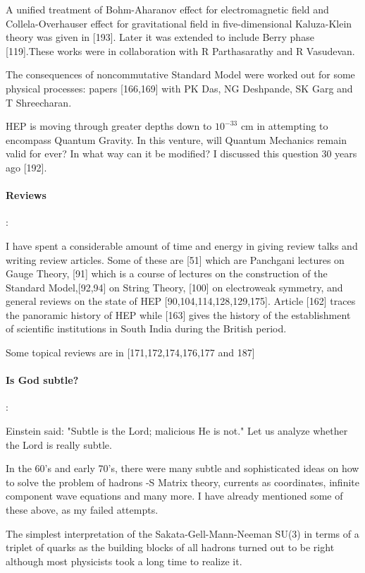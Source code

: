A unified treatment of Bohm-Aharanov effect for electromagnetic field 
and Collela-Overhauser effect for gravitational field in 
five-dimensional Kaluza-Klein theory was given in [193]. Later it was 
extended to include Berry phase [119].These works were in collaboration 
with R Parthasarathy and R Vasudevan.

The consequences of noncommutative Standard Model were worked out for 
some physical processes: papers [166,169] with PK Das, NG Deshpande, SK 
Garg and T Shreecharan.

HEP is moving through greater depths down to $10^{-33}$ cm in attempting 
to encompass Quantum Gravity. In this venture, will Quantum Mechanics 
remain valid for ever? In what way can it be modified? I discussed this 
question 30 years ago [192].

\paragraph{Reviews}:

I have spent a considerable amount of time and energy in giving review 
talks and writing review articles. Some of these are [51] which are 
Panchgani lectures on Gauge Theory, [91] which is a course of lectures 
on the construction of the Standard Model,[92,94] on String Theory, 
[100] on electroweak symmetry, and general reviews on the state of HEP 
[90,104,114,128,129,175]. Article [162] traces the panoramic history of 
HEP while [163] gives the history of the establishment of scientific 
institutions in South India during the British period.

Some topical reviews are in [171,172,174,176,177 and 187]

\paragraph{Is God subtle?}:

Einstein said: "Subtle is the Lord; malicious He is not." Let us analyze 
whether the Lord is really subtle.

In the 60's and early 70's, there were many subtle and sophisticated 
ideas on how to solve the problem of hadrons -S Matrix theory, currents 
as coordinates, infinite component wave equations and many more. I have 
already mentioned some of these above, as my failed attempts.

The simplest interpretation of the Sakata-Gell-Mann-Neeman SU(3) in 
terms of a triplet of quarks as the building blocks of all hadrons 
turned out to be right although most physicists took a long time to 
realize it.

